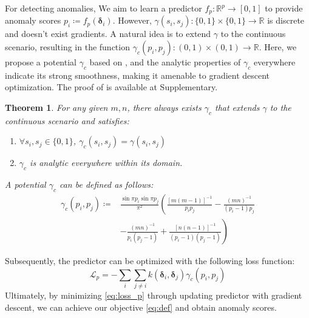 \documentclass{article}
\newtheorem{theorem}{Theorem}[section]
\begin{document}
For detecting anomalies, We aim to learn a predictor $f_p:\mathbb{R}^p \rightarrow [0, 1]$ to provide anomaly scores $p_i \coloneqq f_p(\bm{\delta}_i)$.
However, $\gamma(s_i, s_j): \{0, 1\} \times \{0, 1\} \rightarrow \mathbb{R}$ is discrete and doesn't exist gradients.
A natural idea is to extend $\gamma$ to the continuous scenario, resulting in the function $\gamma_c(p_i, p_j): (0, 1) \times (0, 1) \rightarrow \mathbb{R}$.
Here, we propose a potential $\gamma_c$ based on , and the analytic properties of $\gamma_c$ everywhere indicate its strong smoothness, making it amenable to gradient descent optimization.
The proof of  is available at Supplementary.
\begin{theorem}\label{th:gamma_c}
    For any given $m, n$, there always exists $\gamma_c$ that extends $\gamma$ to the continuous scenario and satisfies:
    \begin{enumerate}[(1)]
        \item $\forall s_i, s_j \in \{0, 1\}$, $\gamma_c(s_i, s_j)=\gamma(s_i, s_j)$
        \item $\gamma_c$ is analytic everywhere within its domain.
    \end{enumerate}
    A potential $\gamma_c$ can be defined as follows:
    \begin{equation}\label{eq:gamma_c}
        \begin{aligned}
            \gamma_c(p_i, p_j) \coloneqq & \frac{\sin\pi p_i \sin\pi p_j}{\pi^2}\left(\frac{[m(m-1)]^{-1}}{p_ip_j} - \frac{(mn)^{-1}}{(p_i-1)p_j} \right.\\
            & \left.- \frac{(mn)^{-1}}{p_i(p_j-1)} + \frac{[n(n-1)]^{-1}}{(p_i-1)(p_j-1)}\right)
        \end{aligned}
    \end{equation}
\end{theorem}
Subsequently, the predictor can be optimized with the following loss function:
\begin{equation}\label{eq:loss_p}
    \mathcal{L}_p = -\sum_{i}\sum_{j\neq i} k(\bm{\delta}_i, \bm{\delta}_j) \gamma_c(p_i, p_j)
\end{equation}
Ultimately, by minimizing \eqref{eq:loss_p} through updating predictor with gradient descent, we can achieve our objective \eqref{eq:def} and obtain anomaly scores.
\end{document}
